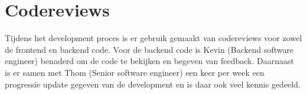 \section{Codereviews}
Tijdens het development proces is er gebruik gemaakt van codereviews voor zowel de frontend en backend code.
Voor de backend code is Kevin (Backend software engineer) benaderd om de code te bekijken en begeven van feedback.
Daarnaast is er samen met Thom (Senior software engineer) een keer per week een progressie update gegeven van de development en is daar ook veel kennis gedeeld. 


